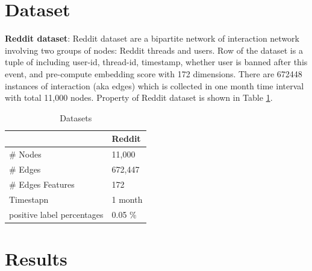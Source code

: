 \documentclass{IEEEtran}
\begin{document}
\section{Dataset}
\label{sec:orga27b1e1}
\textbf{Reddit dataset}: Reddit dataset are a bipartite network of interaction network involving two groups of nodes: Reddit threads and users. Row of the dataset is a tuple of including user-id, thread-id, timestamp, whether user is banned after this event, and pre-compute embedding score with 172 dimensions. There are 672448 instances of interaction (aka edges) which is collected in one month time interval with total 11,000 nodes. Property of Reddit dataset is shown in Table \ref{Datasets}.

\begin{table}[htbp]
\caption{\label{Datasets}Datasets}
\centering
\begin{tabular}{ll}
\hline
\hline
 & Reddit\\
\hline
\# Nodes & 11,000\\
\# Edges & 672,447\\
\# Edges Features & 172\\
Timestapn & 1 month\\
positive label percentages & 0.05 \%\\
\end{tabular}
\end{table}
\section{Results}
\label{sec:orgc2c1343}
\printbibliography
\end{document}

